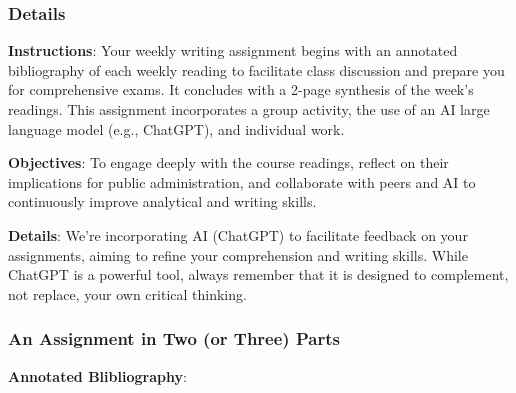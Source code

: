 \documentclass[12pt, letterpaper]{article}
\begin{document}
\subsubsection*{Details}

\textbf{Instructions}: Your weekly writing assignment begins with an annotated bibliography of each weekly reading to facilitate class discussion and prepare you for comprehensive exams. It concludes with a 2-page synthesis of the week’s readings. This assignment incorporates a group activity, the use of an AI large language model (e.g., ChatGPT), and individual work.

\textbf{Objectives}: To engage deeply with the course readings, reflect on their implications for public administration, and collaborate with peers and AI to continuously improve analytical and writing skills.

\textbf{Details}: We’re incorporating AI (ChatGPT) to facilitate feedback on your assignments, aiming to refine your comprehension and writing skills. While ChatGPT is a powerful tool, always remember that it is designed to complement, not replace, your own critical thinking.

\subsubsection*{An Assignment in Two (or Three) Parts}

\textbf{Annotated Blibliography}: 
\end{document}
